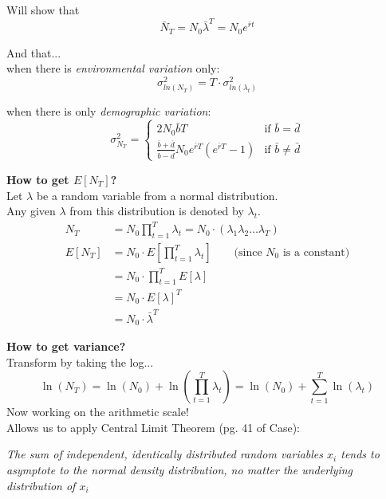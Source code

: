 \documentclass{article}
\begin{document}
Will show that
\begin{equation*}
	\bar{N}_T = N_0 \bar{\lambda}^T = N_0 e^{\bar{r}t}
\end{equation*}

And that...\\
when there is \emph{environmental variation} only:
\begin{equation*}
	\sigma^2_{ln(N_T)}=T \cdot \sigma^2_{ln(\lambda_t)}
\end{equation*}

when there is only \emph{demographic variation}:
\begin{equation*}
  \sigma_{N_T}^2 =
  \begin{cases} 
        2N_0 \bar{b} T & \text{if } \bar{b}=\bar{d} \\
        \frac{\bar{b}+\bar{d}}{\bar{b}-\bar{d}} N_0 e^{\bar{r}T}(e^{\bar{r}T}-1) & \text{if } \bar{b} \neq \bar{d}
    \end{cases}
 \end{equation*}

\pagebreak

\textbf{How to get $E[N_T]$?}\\
Let $\lambda$ be a random variable from a normal distribution.\\
Any given $\lambda$ from this distribution is denoted by $\lambda_t$.
\begin{align*}
	N_T &= N_0 \prod_{t=1}^T \lambda_t = N_0 \cdot (\lambda_1 \lambda_2 \dots \lambda_T)\\
	E[N_T] &= N_0 \cdot E[\prod_{t=1}^T \lambda_t] \qquad \text{(since } N_0 \text{ is a constant)}\\
		& = N_0 \cdot \prod_{t=1}^TE[\lambda]\\
		& = N_0 \cdot E[\lambda]^T\\
		& = N_0 \cdot \bar{\lambda}^T
\end{align*}

\textbf{How to get variance?}\\
Transform by taking the log...\\
\begin{equation*}
	\ln(N_T)=\ln(N_0)+\ln\left(\prod_{t=1}^T \lambda_t\right) =\ln(N_0)+ \boxed{ \sum_{t=1}^T \ln(\lambda_t)}
\end{equation*}
Now working on the arithmetic scale!\\
Allows us to apply Central Limit Theorem (pg. 41 of Case):
\begin{center}
	\emph{The sum of independent, identically distributed random variables $x_i$ tends to asymptote to the normal density distribution, no matter the underlying distribution of $x_i$}
\end{center}
\end{document}

